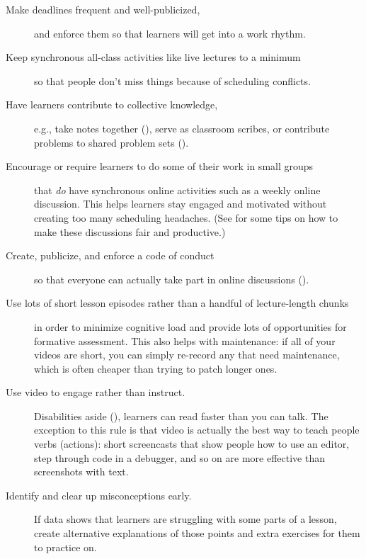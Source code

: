 \begin{description}

\item[Make deadlines frequent and well-publicized,]
  and enforce them so that learners will get into a work rhythm.

\item[Keep synchronous all-class activities like live lectures to a minimum]
  so that people don't miss things because of scheduling conflicts.

\item[Have learners contribute to collective knowledge,]
  e.g., take notes together (),
  serve as classroom scribes,
  or contribute problems to shared problem sets ().

\item[Encourage or require learners to do some of their work in small groups]
  that \emph{do} have synchronous online activities
  such as a weekly online discussion.
  This helps learners stay engaged and motivated without creating too many scheduling headaches.
  (See  for some tips on how to make these discussions fair and productive.)

\item[Create, publicize, and enforce a code of conduct]
  so that everyone can actually take part in online discussions ().

\item[Use lots of short lesson episodes rather than a handful of lecture-length chunks]
  in order to minimize cognitive load
  and provide lots of opportunities for formative assessment.
  This also helps with maintenance:
  if all of your videos are short,
  you can simply re-record any that need maintenance,
  which is often cheaper than trying to patch longer ones.

\item[Use video to engage rather than instruct.]
  Disabilities aside (),
  learners can read faster than you can talk.
  The exception to this rule is that
  video is actually the best way to teach people verbs (actions):
  short screencasts that show people how to use an editor,
  step through code in a debugger,
  and so on are more effective than screenshots with text.

\item[Identify and clear up misconceptions early.]
  If data shows that learners are struggling with some parts of a lesson,
  create alternative explanations of those points
  and extra exercises for them to practice on.

\end{description}

